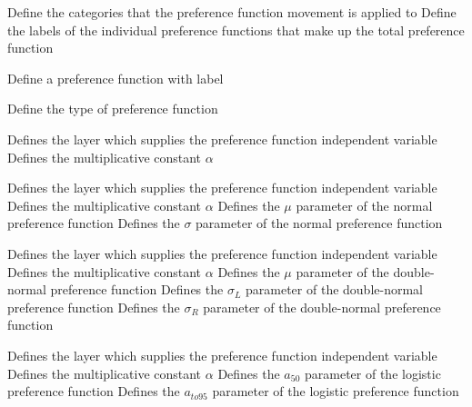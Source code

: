 \par\textbf{}\par
\par\textbf{}\par
{} {Define the categories that the preference function movement is applied to}
 {Define the labels of the individual  preference functions that make up the total preference function}
\par {} {Define a preference function with label}\par
{} {Define the type of preference function}
\par\textbf{}\par
{} {Defines the layer which supplies the preference function independent variable}
 {Defines the multiplicative constant $\alpha$}
\par\textbf{}\par
{} {Defines the layer which supplies the preference function independent variable}
 {Defines the multiplicative constant $\alpha$}
 {Defines the $\mu$ parameter of the normal preference function}
 {Defines the $\sigma$ parameter of the normal preference function}
\par\textbf{}\par
{} {Defines the layer which supplies the preference function independent variable}
 {Defines the multiplicative constant $\alpha$}
 {Defines the $\mu$ parameter of the double-normal preference function}
 {Defines the $\sigma_L$ parameter of the double-normal preference function}
 {Defines the $\sigma_R$ parameter of the double-normal preference function}
\par\textbf{}\par
{} {Defines the layer which supplies the preference function independent variable}
 {Defines the multiplicative constant $\alpha$}
 {Defines the $a_{50}$ parameter of the logistic preference function}
 {Defines the $a_{to95}$ parameter of the logistic preference function}
\par\textbf{}\par
